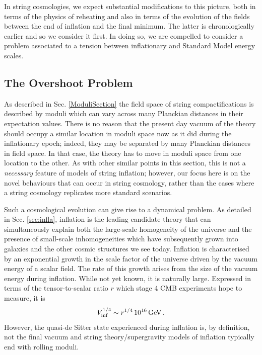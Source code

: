 In string cosmologies, we expect substantial modifications to this picture, both in terms of the physics of reheating and also in terms of the evolution of the fields between the end of inflation and the final minimum. The latter is chronologically earlier and so we consider it first. 
In doing so, we are compelled to consider a problem associated to a tension between inflationary and Standard Model energy scales.

\subsection{The Overshoot Problem}

As described in Sec. \ref{ModuliSection} the field space of string compactifications is described by moduli which can vary across many Planckian distances in their expectation values. There is no reason that the present day vacuum of the theory should occupy a similar location in moduli space now 
as it did during the inflationary epoch; indeed, they may be separated by many Planckian distances in field space. In that case, the theory has to move in moduli space from one location to the other. As with other similar points in this section, this is not a \emph{necessary} feature of models of string inflation; however, our focus here is on the novel behaviours that can occur in string cosmology, rather than the cases where a string cosmology replicates more standard scenarios.

Such a cosmological evolution can give rise to a dynamical problem. As detailed in Sec. \ref{sec:infla}, inflation is the leading candidate theory that can simultaneously explain both the large-scale homogeneity of the universe and the presence of small-scale inhomogeneities which have subsequently grown into galaxies and the other cosmic structures we see today. Inflation is characterised by an exponential growth in the scale factor of the universe driven by the vacuum energy of a scalar field. The rate of this growth arises from the size of the vacuum energy during inflation. While not yet known, it is naturally large. Expressed in terms of the tensor-to-scalar ratio $r$ which stage 4 CMB experiments hope to measure, it is
\begin{equation}
V_{\rm inf}^{1/4} \sim r^{1/4}\, 10^{16}\, \rm{GeV}\,.
\end{equation}
However, the quasi-de Sitter state experienced during inflation is, by definition, not the final vacuum and string theory/supergravity models of inflation typically end with rolling moduli.

